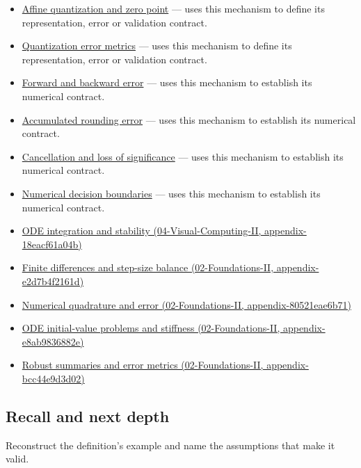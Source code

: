 \begin{itemize}
\item
  \hyperref[appendix-d5da3eaabaef]{Affine quantization and zero point} --- uses this mechanism to define its representation, error or validation contract.
\item
  \hyperref[appendix-537171d69d27]{Quantization error metrics} --- uses this mechanism to define its representation, error or validation contract.
\item
  \hyperref[appendix-a7fbaf6d1b1c]{Forward and backward error} --- uses this mechanism to establish its numerical contract.
\item
  \hyperref[appendix-f82e270791c8]{Accumulated rounding error} --- uses this mechanism to establish its numerical contract.
\item
  \hyperref[appendix-a2773a6a2f9d]{Cancellation and loss of significance} --- uses this mechanism to establish its numerical contract.
\item
  \hyperref[appendix-c80db39080be]{Numerical decision boundaries} --- uses this mechanism to establish its numerical contract.
\item
  \href{../04-Visual-Computing-II/main.pdf\#nameddest=appendix-18eacf61a04b}{ODE integration and stability (04-Visual-Computing-II, appendix-18eacf61a04b)}
\item
  \href{../02-Foundations-II/main.pdf\#nameddest=appendix-e2d7b4f2161d}{Finite differences and step-size balance (02-Foundations-II, appendix-e2d7b4f2161d)}
\item
  \href{../02-Foundations-II/main.pdf\#nameddest=appendix-80521eae6b71}{Numerical quadrature and error (02-Foundations-II, appendix-80521eae6b71)}
\item
  \href{../02-Foundations-II/main.pdf\#nameddest=appendix-e8ab9836882e}{ODE initial-value problems and stiffness (02-Foundations-II, appendix-e8ab9836882e)}
\item
  \href{../02-Foundations-II/main.pdf\#nameddest=appendix-bcc44e9d3d02}{Robust summaries and error metrics (02-Foundations-II, appendix-bcc44e9d3d02)}
\end{itemize}

\subsection{Recall and next depth}\label{appendix-3ae74e89b4e6-recall-and-next-depth}

Reconstruct the definition's example and name the assumptions that make it valid.

